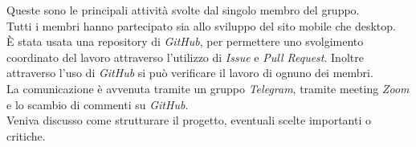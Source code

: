 Queste sono le principali attività svolte dal singolo membro del gruppo.\\
Tutti i membri hanno partecipato sia allo sviluppo del sito mobile che desktop.\\
È stata usata una repository di \emph{GitHub}, per permettere uno svolgimento coordinato del lavoro attraverso l'utilizzo di \emph{Issue} e \emph{Pull Request}. Inoltre attraverso l'uso di \emph{GitHub} si può verificare il lavoro di ognuno dei membri.\\
La comunicazione è avvenuta tramite un gruppo \emph{Telegram}, tramite meeting \emph{Zoom} e lo scambio di commenti su \emph{GitHub}.\\
Veniva discusso come strutturare il progetto, eventuali scelte importanti o critiche. %